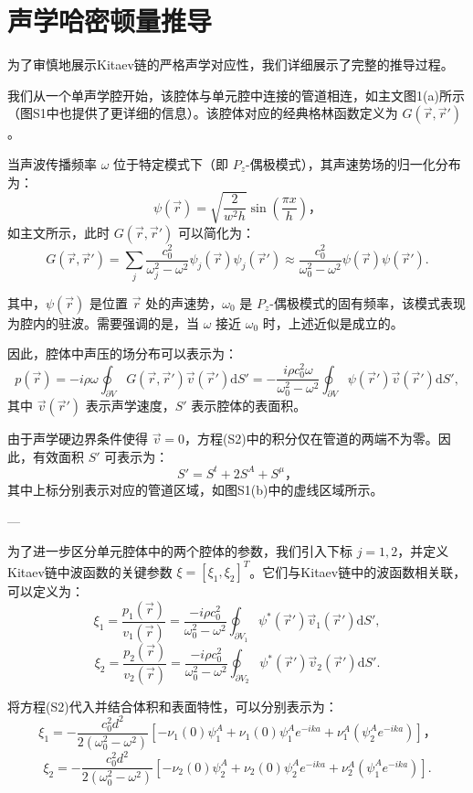 \section{声学哈密顿量推导}

为了审慎地展示Kitaev链的严格声学对应性，我们详细展示了完整的推导过程。

我们从一个单声学腔开始，该腔体与单元腔中连接的管道相连，如主文图1(a)所示（图S1中也提供了更详细的信息）。该腔体对应的经典格林函数定义为 \( G(\vec{r}, \vec{r}') \)。

当声波传播频率 \( \omega \) 位于特定模式下（即 \( P_z \)-偶极模式），其声速势场的归一化分布为：
\[
\psi(\vec{r}) = \sqrt{\frac{2}{w^2 h}} \sin\left(\frac{\pi x}{h}\right)，
\]
如主文所示，此时 \( G(\vec{r}, \vec{r}') \) 可以简化为：
\[
G(\vec{r}, \vec{r}') = \sum_j \frac{c_0^2}{\omega_j^2 - \omega^2} \psi_j(\vec{r}) \psi_j(\vec{r}')
\approx \frac{c_0^2}{\omega_0^2 - \omega^2} \psi(\vec{r}) \psi(\vec{r}'). 
\]

其中，\( \psi(\vec{r}) \) 是位置 \( \vec{r} \) 处的声速势，\( \omega_0 \) 是 \( P_z \)-偶极模式的固有频率，该模式表现为腔内的驻波。需要强调的是，当 \( \omega \) 接近 \( \omega_0 \) 时，上述近似是成立的。

因此，腔体中声压的场分布可以表示为：
\[
p(\vec{r}) = -i \rho \omega \oint_{\partial V} G(\vec{r}, \vec{r}') \vec{v}(\vec{r}') \mathrm{d}S'
= -\frac{i \rho c_0^2 \omega}{\omega_0^2 - \omega^2} \oint_{\partial V} \psi(\vec{r}') \vec{v}(\vec{r}') \mathrm{d}S', 
\]
其中 \( \vec{v}(\vec{r}') \) 表示声学速度，\( S' \) 表示腔体的表面积。

由于声学硬边界条件使得 \( \vec{v} = 0 \)，方程(S2)中的积分仅在管道的两端不为零。因此，有效面积 \( S' \) 可表示为：
\[
S' = S^t + 2S^A + S^\mu，
\]
其中上标分别表示对应的管道区域，如图S1(b)中的虚线区域所示。

---

为了进一步区分单元腔体中的两个腔体的参数，我们引入下标 \( j = 1, 2 \)，并定义Kitaev链中波函数的关键参数 \( \xi = [\xi_1, \xi_2]^T \)。它们与Kitaev链中的波函数相关联，可以定义为：
\[
\xi_1 = \frac{p_1(\vec{r})}{v_1(\vec{r})} = \frac{-i \rho c_0^2}{\omega_0^2 - \omega^2} \oint_{\partial V_1} \psi^*(\vec{r}') \vec{v}_1(\vec{r}') \mathrm{d}S',
\]
\[
\xi_2 = \frac{p_2(\vec{r})}{v_2(\vec{r})} = \frac{-i \rho c_0^2}{\omega_0^2 - \omega^2} \oint_{\partial V_2} \psi^*(\vec{r}') \vec{v}_2(\vec{r}') \mathrm{d}S'. 
\]

将方程(S2)代入并结合体积和表面特性，可以分别表示为：
\[
\xi_1 = -\frac{c_0^2 d^2}{2(\omega_0^2 - \omega^2)} \left[ -\nu_1(0) \psi_1^A + \nu_1(0) \psi_1^A e^{-ika} + \nu_1^A(\psi_2^A e^{-ika}) \right]，
\]
\[
\xi_2 = -\frac{c_0^2 d^2}{2(\omega_0^2 - \omega^2)} \left[ -\nu_2(0) \psi_2^A + \nu_2(0) \psi_2^A e^{-ika} + \nu_2^A(\psi_1^A e^{-ika}) \right]. 
\]

